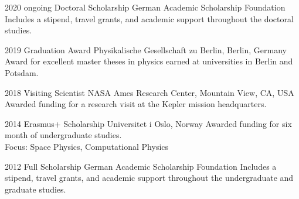 \documentclass[]{k-cv} %
\begin{document}
\begin{entrylist}
\entry
{2020 \to ongoing}
{Doctoral Scholarship}
{German Academic Scholarship Foundation}
{Includes a stipend, travel grants, and academic support throughout the doctoral studies.}

\entry
{2019}
{Graduation Award}
{Physikalische Gesellschaft zu Berlin, Berlin, Germany}
{Award for excellent master theses in physics earned at universities in Berlin and Potsdam.}


\entry
{2018}
{Visiting Scientist}
{NASA Ames Research Center, Mountain View, CA, USA}
{Awarded funding for a research visit at the Kepler mission headquarters.}


\entry
{2014}
{Erasmus+ Scholarship}
{Universitet i Oslo, Norway}
{Awarded funding for six month of undergraduate studies.\\
Focus: Space Physics, Computational Physics}

\entry
{2012 }
{Full Scholarship}
{German Academic Scholarship Foundation}
{Includes a stipend, travel grants, and academic support throughout the undergraduate and graduate studies.}

\end{entrylist}





\end{document}
